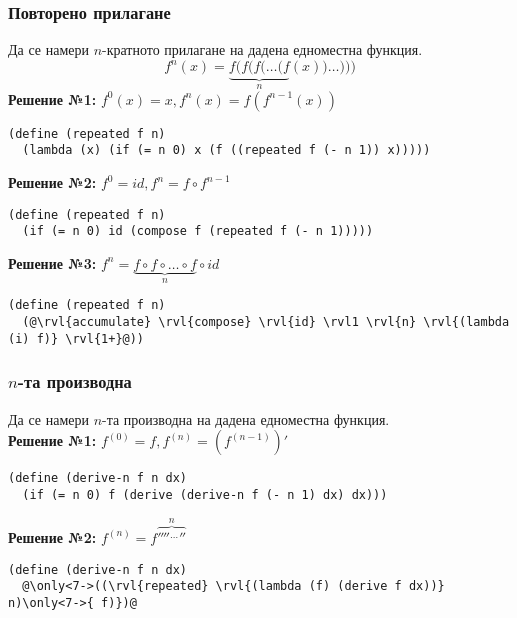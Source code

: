 \documentclass{beamer}
\begin{document}
\begin{frame}[fragile]
  \frametitle{Повторено прилагане}

  Да се намери $n$-кратното прилагане на дадена едноместна функция.
  \begin{equation*}
    f^n(x) = \underbrace{f(f(f(\ldots(f}_n(x))\ldots)))
  \end{equation*}
  \pause
  \textbf{Решение №1:} $f^0(x) = x, f^n(x) = f(f^{n-1}(x))$ \pause
\begin{lstlisting}
(define (repeated f n)
  (lambda (x) (if (= n 0) x (f ((repeated f (- n 1)) x)))))
\end{lstlisting}
  \pause
  \textbf{Решение №2:} $f^0 = id, f^n = f\circ f^{n-1}$ \pause
\begin{lstlisting}
(define (repeated f n)
  (if (= n 0) id (compose f (repeated f (- n 1)))))
\end{lstlisting}
  \pause
  \textbf{Решение №3:} $f^n = \underbrace{f \circ f \circ \ldots \circ f}_n \circ  id$ \pause
\begin{lstlisting}
(define (repeated f n)
  (@\rvl{accumulate} \rvl{compose} \rvl{id} \rvl1 \rvl{n} \rvl{(lambda (i) f)} \rvl{1+}@))
\end{lstlisting}
\end{frame}

\begin{frame}[fragile]
  \frametitle{$n$-та производна}

  \begin{overlayarea}\textwidth\textheight
  Да се намери $n$-та производна на дадена едноместна функция.\\[1em]
  \pause
  \textbf{Решение №1:} $f^{(0)} = f, f^{(n)} = (f^{(n-1)})'$\pause
\begin{lstlisting}
(define (derive-n f n dx)
  (if (= n 0) f (derive (derive-n f (- n 1) dx) dx)))
\end{lstlisting}
  \pause
  \textbf{Решение №2:} $f^{(n)} = f\overbrace{''''{}^{\ldots}{}''}^n$\pause
\begin{lstlisting}
(define (derive-n f n dx)
  @\only<7->((\rvl{repeated} \rvl{(lambda (f) (derive f dx))} n)\only<7->{ f)})@
\end{lstlisting}
\end{overlayarea}
\end{frame}
\end{document}
